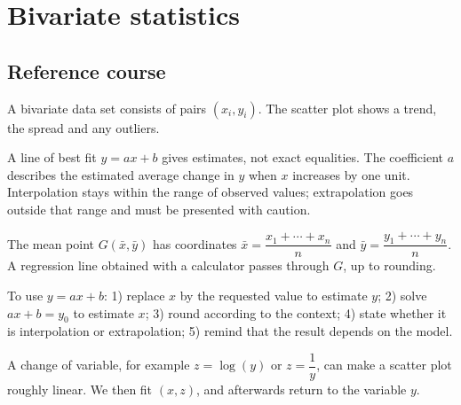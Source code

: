 
\chapter{Bivariate statistics}
\section{Reference course}
A bivariate data set consists of pairs $(x_i,y_i)$. The scatter plot shows a trend, the spread and any outliers.

\begin{center}
\end{center}

\begin{retenir}
A line of best fit $y=ax+b$ gives estimates, not exact equalities. The coefficient $a$ describes the estimated average change in $y$ when $x$ increases by one unit. Interpolation stays within the range of observed values; extrapolation goes outside that range and must be presented with caution.
\end{retenir}

The mean point $G(\bar x,\bar y)$ has coordinates $\bar x=\dfrac{x_1+\cdots+x_n}{n}$ and $\bar y=\dfrac{y_1+\cdots+y_n}{n}$. A regression line obtained with a calculator passes through $G$, up to rounding.

\begin{methode}
To use $y=ax+b$: 1) replace $x$ by the requested value to estimate $y$; 2) solve $ax+b=y_0$ to estimate $x$; 3) round according to the context; 4) state whether it is interpolation or extrapolation; 5) remind that the result depends on the model.
\end{methode}

A change of variable, for example $z=\log(y)$ or $z=\dfrac1y$, can make a scatter plot roughly linear. We then fit $(x,z)$, and afterwards return to the variable $y$.

